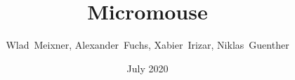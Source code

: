 \title{Micromouse}
\date{July 2020}
\author{Wlad~Meixner, Alexander~Fuchs, Xabier~Irizar, Niklas~Guenther}
\subject{Lab Report}
\publishers{}
\maketitle

